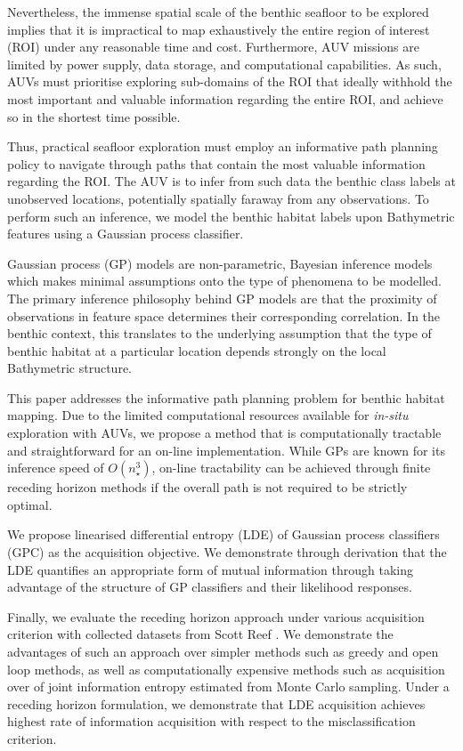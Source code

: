 \documentclass{article}
\begin{document}
	Nevertheless, the immense spatial scale of the benthic seafloor to be explored implies that it is impractical to map exhaustively the entire region of interest (ROI) under any reasonable time and cost. Furthermore, AUV missions are limited by power supply, data storage, and computational capabilities. As such, AUVs must prioritise exploring sub-domains of the ROI that ideally withhold the most important and valuable information regarding the entire ROI, and achieve so in the shortest time possible.
	
	Thus, practical seafloor exploration must employ an informative path planning policy to navigate through paths that contain the most valuable information regarding the ROI. The AUV is to infer from such data the benthic class labels at unobserved locations, potentially spatially faraway from any observations. To perform such an inference, we model the benthic habitat labels upon Bathymetric features using a Gaussian process classifier.
	
	Gaussian process (GP) models are non-parametric, Bayesian inference models which makes minimal assumptions onto the type of phenomena to be modelled. The primary inference philosophy behind GP models are that the proximity of observations in feature space determines their corresponding correlation. In the benthic context, this translates to the underlying assumption that the type of benthic habitat at a particular location depends strongly on the local Bathymetric structure.
	
	This paper addresses the informative path planning problem for benthic habitat mapping. Due to the limited computational resources available for \textit{in-situ} exploration with AUVs, we propose a method that is computationally tractable and straightforward for an on-line implementation. While GPs are known for its inference speed of $O(n_{\star}^{3})$, on-line tractability can be achieved through finite receding horizon methods if the overall path is not required to be strictly optimal.
	
	We propose linearised differential entropy (LDE) of Gaussian process classifiers (GPC) as the acquisition objective. We demonstrate through derivation that the LDE quantifies an appropriate form of mutual information through taking advantage of the structure of GP classifiers and their likelihood responses.
	
	Finally, we evaluate the receding horizon approach under various acquisition criterion with collected datasets from Scott Reef \cite{IMOS}. We demonstrate the advantages of such an approach over simpler methods such as greedy and open loop methods, as well as computationally expensive methods such as acquisition over of joint information entropy estimated from Monte Carlo sampling.  Under a receding horizon formulation, we demonstrate that LDE acquisition achieves highest rate of information acquisition with respect to the misclassification criterion.
	
\end{document}
